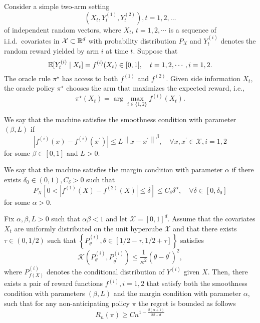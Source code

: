 Consider a simple two-arm setting
$$
\left(X_t, Y_t^{(1)}, Y_t^{(2)}\right), t=1,2, \ldots
$$
of independent random vectors, where $X_t$, $t = 1,2, \cdots$ is a sequence of i.i.d.~covariates in $\mathcal{X} \subset \mathbb{R}^d$ with probability distribution $P_X$ and $Y_t^{(i)}$ denotes the random reward yielded by arm $i$ at time $t$.
Suppose that 
\begin{equation*}
    \mathbb{E} [Y^{(i)}_t \mid X_t] = f^{(i)}(X_t) \in [0,1], \quad t = 1,2, \cdots, i = 1,2.
\end{equation*}  
The oracle rule $\pi^\star$ has access to both $f^{(1)}$ and $f^{(2)}$. 
Given side information $X_t$, the oracle policy $\pi^\star$ chooses the arm that maximizes the expected reward, i.e.,
\begin{equation*}
    \pi^\star(X_t) = \arg \max_{i \in \{1,2\}} f^{(i)}(X_t).
\end{equation*}

We say that the machine satisfies the smoothness condition with parameter $(\beta, L)$ if
\begin{equation*}
    \left|f^{(i)}(x)-f^{(i)}\left(x^{\prime}\right)\right| \leq L\left\|x-x^{\prime}\right\|^\beta, \quad \forall x, x^{\prime} \in \mathcal{X}, i=1,2
\end{equation*}
for some $\beta \in [0,1]$ and $L > 0$.

We say that the machine satisfies the margin condition with parameter $\alpha$ if there exists $\delta_0 \in(0,1), C_\delta>0$ such that
$$
P_X\left[0<\left|f^{(1)}(X)-f^{(2)}(X)\right| \leq \delta\right] \leq C_\delta \delta^\alpha, \quad \forall \delta \in\left[0, \delta_0\right]
$$
for some $\alpha>0$.

Fix $\alpha, \beta, L>0$ such that $\alpha \beta<1$ and let $\mathcal{X}=[0,1]^d$. Assume that the covariates $X_t$ are uniformly distributed on the unit hypercube $\mathcal{X}$ and that there exists $\tau \in(0,1 / 2)$ such that $\left\{P_\theta^{(i)}, \theta \in[1 / 2-\tau, 1 / 2+\tau]\right\}$ satisfies 
\begin{equation*}
    \mathcal{K}\left(P_\theta^{(i)}, P_{\theta^{\prime}}^{(i)}\right) \leq \frac{1}{\kappa^2}\left(\theta-\theta^{\prime}\right)^2,
\end{equation*}
where $P_{f(X)}^{(i)}$ denotes the conditional distribution of $Y^{(i)}$ given $X$. 
Then, there exists a pair of reward functions $f^{(i)}, i=1,2$ that satisfy both the smoothness condition with parameters $(\beta, L)$ and the margin condition with parameter $\alpha$, such that for any non-anticipating policy $\pi$ the regret is bounded as follows
$$
R_n(\pi) \geq C n^{1-\frac{\beta(\alpha+1)}{2 \beta+d}}
$$
